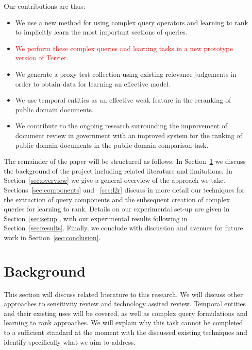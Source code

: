 \documentclass{mpaper}
\newcommand{\remove}[1]{\textcolor{red}{#1}}
\begin{document}
Our contributions are thus:
\begin{itemize}
\item We use a  new method for using complex query operators and learning to rank to implicitly learn the most important sections of queries.
\item \remove{We perform these complex queries and learning tasks in a new prototype version of Terrier.}
\item We generate a proxy test collection using existing relevance judgements in order to obtain data for learning an effective model.
\item We use temporal entities as an effective weak feature in the reranking of public domain documents. %
\item We contribute to the ongoing research surrounding the improvement of document review in government with an improved system for the ranking of public domain documents in the public domain comparison task.
\end{itemize}

The remainder of the paper will be structured as follows.
In Section~\ref{sec:background} we discuss the background of the project including related literature and limitations.
In Section~\ref{sec:overview} we give a general overview of the approach we take.
Sections~\ref{sec:components} and ~\ref{sec:l2r} discuss in more detail our techniques for the extraction of query components and the subsequent creation of complex queries for learning to rank.
Details on our experimental set-up are given in Section~\ref{sec:setup}, with our experimental results following in Section~\ref{sec:results}.
Finally, we conclude with discussion and avenues for future work in Section~\ref{sec:conclusion}.

\section{Background} \label{sec:background}
This section will discuss related literature to this research. We will discuss other approaches to sensitivity review and technology assited review. Temporal entities and their existing uses will be covered, as well as complex query formulations and learning to rank approaches. We will explain why this task cannot be completed to a sufficient standard at the moment with the discussed existing techniques and identify specifically what we aim to address.
\end{document}
